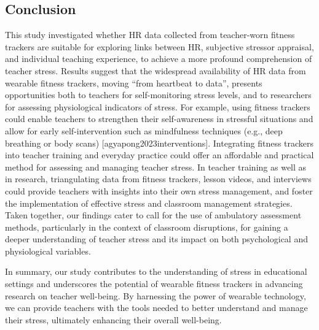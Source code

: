 \documentclass[preprint, 3p,
authoryear]{elsarticle} %
\begin{document}
\subsection{Conclusion}\label{conclusion}

This study investigated whether HR data collected from teacher-worn
fitness trackers are suitable for exploring links between HR, subjective
stressor appraisal, and individual teaching experience, to achieve a
more profound comprehension of teacher stress. Results suggest that the
widespread availability of HR data from wearable fitness trackers,
moving ``from heartbeat to data'', presents opportunities both to
teachers for self-monitoring stress levels, and to researchers for
assessing physiological indicators of stress. For example, using fitness
trackers could enable teachers to strengthen their self-awareness in
stressful situations and allow for early self-intervention such as
mindfulness techniques (e.g., deep breathing or body scans)
{[}agyapong2023interventions{]}. Integrating fitness trackers into
teacher training and everyday practice could offer an affordable and
practical method for assessing and managing teacher stress. In teacher
training as well as in research, triangulating data from fitness
trackers, lesson videos, and interviews could provide teachers with
insights into their own stress management, and foster the implementation
of effective stress and classroom management strategies. Taken together,
our findings cater to \citet{wettstein2021} call for the use of
ambulatory assessment methods, particularly in the context of classroom
disruptions, for gaining a deeper understanding of teacher stress and
its impact on both psychological and physiological variables.

In summary, our study contributes to the understanding of stress in
educational settings and underscores the potential of wearable fitness
trackers in advancing research on teacher well-being. By harnessing the
power of wearable technology, we can provide teachers with the tools
needed to better understand and manage their stress, ultimately
enhancing their overall well-being.


\end{document}
